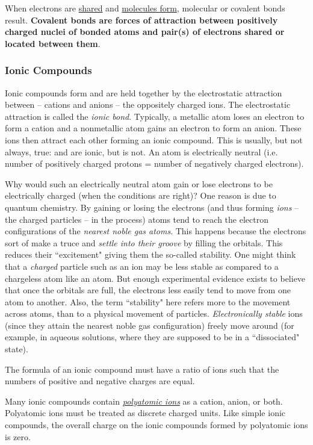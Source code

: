 \documentclass{article}
\begin{document}
When electrons are \underline{shared} and \underline{molecules form}, molecular or covalent bonds result. \textbf{Covalent bonds are forces of attraction between positively charged nuclei of bonded atoms and pair(s) of electrons shared or located between them}.
\subsubsection{Ionic Compounds}
Ionic compounds form and are held together by the electrostatic attraction between -- cations and anions -- the oppositely charged ions. The electrostatic attraction is called the \emph{ionic bond}. Typically, a metallic atom loses an electron to form a cation and a nonmetallic atom gains an electron to form an anion. These ions then attract each other forming an ionic compound. This is usually, but not always, true:  and  are ionic, but  is not. An atom is electrically neutral (i.e. number of positively charged protons = number of negatively charged electrons). 

Why would such an electrically neutral atom gain or lose electrons to be electrically charged (when the conditions are right)? One reason is due to quantum chemistry. By gaining or losing the electrons (and thus forming \emph{ions} -- the charged particles -- in the process) atoms tend to reach the electron configurations of the \emph{nearest noble gas atoms}. This happens because the electrons sort of make a truce and \emph{settle into their groove} by filling the orbitals. This reduces their ``excitement" giving them the so-called stability. One might think that a \emph{charged} particle such as an  ion may be less stable as compared to a chargeless atom like an  atom. But enough experimental evidence exists to believe that once the orbitals are full, the electrons less easily tend to move from one atom to another. Also, the term ``stability" here refers more to the movement across atoms, than to a physical movement of particles. \emph{Electronically stable} ions (since they attain the nearest noble gas configuration) freely move around (for example, in aqueous solutions, where they are supposed to be in a ``dissociated" state). 

The formula of an ionic compound must have a ratio of ions such that the numbers of positive and negative charges are equal.

Many ionic compounds contain \hyperref[polyatomic ions]{\emph{polyatomic ions}} as a cation, anion, or both. Polyatomic ions must be treated as discrete charged units. Like simple ionic compounds, the overall charge on the ionic compounds formed by polyatomic ions is zero.
\end{document}
